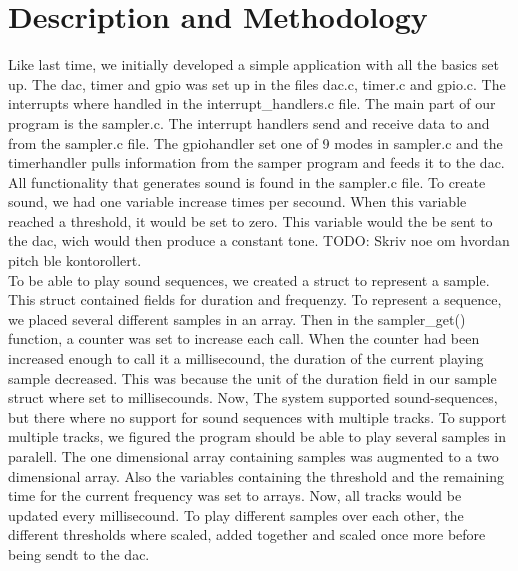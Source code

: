 \section{Description and Methodology}
Like last time, we initially developed a simple application with all the basics set up. The dac, timer and gpio was set up in the files dac.c, timer.c and gpio.c. The interrupts where handled in the interrupt\_handlers.c file. The main part of our program is the sampler.c. The interrupt handlers send and receive data to and from the sampler.c file. The gpiohandler set one of 9 modes in sampler.c and the timerhandler pulls information from the samper program and feeds it to the dac. \\
All functionality that generates sound is found in the sampler.c file. To create sound, we had one variable increase \samplerPullsPerSecound times per secound. When this variable reached a threshold, it would be set to zero. This variable would the be sent to the dac, wich would  then produce a constant tone. TODO: Skriv noe om hvordan pitch ble kontorollert. \\

To be able to play sound sequences, we created a struct to represent  a sample. This struct contained fields for duration and frequenzy. To represent a sequence, we placed several different samples in an array. Then in the sampler\_get() function, a counter was set to increase each call. When the counter had been increased enough to call it a millisecound, the duration of the current playing sample decreased. This was because the  unit of the duration field in our sample struct where set to millisecounds.
Now, The system supported sound-sequences, but there where no support for sound sequences with multiple tracks. To support multiple tracks, we figured the program should be able to play several samples in paralell. The one dimensional array containing samples was augmented to a two dimensional array. Also the variables containing the threshold and the remaining time for the current frequency was set to arrays. Now, all tracks would be updated every millisecound. To play different samples over each other, the different thresholds where scaled, added together and scaled once more before being sendt to the dac.


